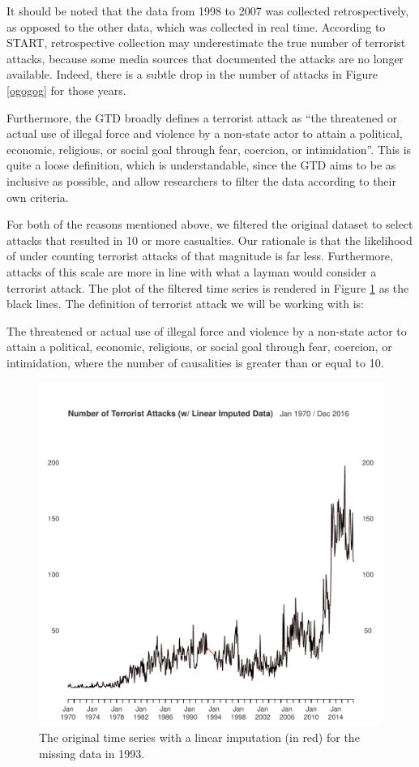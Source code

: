 \documentclass[11pt]{paper}
\begin{document}
It should be noted that the data from 1998 to 2007 was collected retrospectively, as opposed to the other data, which was collected in real time. According to START, retrospective collection may underestimate the true number of terrorist attacks, because some media sources that documented the attacks are no longer available. Indeed, there is a subtle drop in the number of attacks in Figure \ref{ogogog} for those years.

Furthermore, the GTD broadly defines a terrorist attack as ``the threatened or actual use of illegal force and violence by a non-state actor to attain a political, economic, religious, or social goal through fear, coercion, or intimidation''. This is quite a loose definition, which is understandable, since the GTD aims to be as inclusive as possible, and allow researchers to filter the data according to their own criteria.

For both of the reasons mentioned above, we filtered the original dataset to select attacks that resulted in 10 or more casualties. Our rationale is that the likelihood of under counting terrorist attacks of that magnitude is far less. Furthermore, attacks of this scale are more in line with what a layman would consider a terrorist attack. The plot of the filtered time series is rendered in Figure \ref{og} as the black lines. The definition of terrorist attack we will be working with is:

\begin{mydef}
The threatened or actual use of illegal force and violence by a non-state actor to attain a political, economic, religious, or social goal through fear, coercion, or intimidation, where the number of causalities is greater than or equal to 10.
\end{mydef}

\begin{figure}
\centering
\includegraphics[width=0.75\linewidth]{../image/og_ts.pdf}
\caption{The original time series with a linear imputation (in red) for the missing data in 1993.}
\label{og}
\end{figure}
\end{document}
